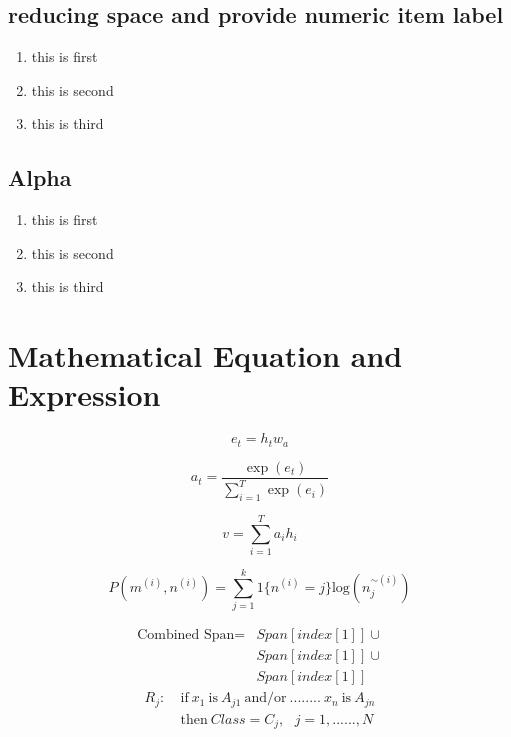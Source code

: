 \documentclass{article}
\begin{document}
\subsection{reducing space and provide numeric item label}
\begin{enumerate}[nosep,label=\arabic*]
\item this is first
\item this is second
\item this is third
\end{enumerate}
\subsection{Alpha}
\begin{enumerate}[A]
\item this is first
\item this is second
\item this is third
\end{enumerate}

\section{Mathematical Equation and Expression}
\begin{equation}
e_{t}=h_{t}w_{a}
\end{equation}

\begin{equation}
a_{t}=\frac{\exp(e_{t})}{\sum^{T}_{i=1}\exp(e_{i})}
\end{equation}

\begin{equation}
v=\sum^{T}_{i=1}a_{i}h_{i}
\end{equation}

\begin{equation}
P(m^{(i)},n^{(i)})=\sum^{k}_{j=1}1{\{n^{(i)}=j\}}\mbox{log}(n_{j}^{\sim(i)})
\end{equation}

\begin{equation*}
\begin{split}
\mbox{Combined Span} = &Span[index[1]] \cup \\  
                       &Span[index[1]] \cup \\
                       &Span[index[1]]
\end{split}
\end{equation*}
\begin{equation*}
\begin{split}
R_j: & \ \mbox{if}\ x_1\ \mbox{is}\ A_{j1}\ \mbox{and/or}\ ........\ x_n\ \mbox{is}\ A_{jn}\\
	 & \ \mbox{then}\ Class=C_j, \ \ \ j=1,......,N
\end{split}
\end{equation*}
\end{document}
